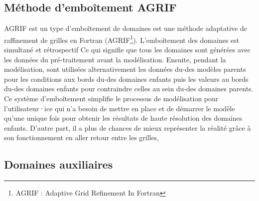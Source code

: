 \documentclass[10pt,a4paper,titlepage]{article}
\begin{document}
\subsection{Méthode d'emboîtement AGRIF}
\label{anx:AGRIF}
AGRIF est un type d'emboîtement de domaines est une méthode adaptative de raffinement de grilles en Fortran (AGRIF\footnote{AGRIF : Adaptive Grid Refinement In Fortran}).
L'emboîtement des domaines est simultané et rétrospectif
Ce qui signifie que tous les domaines sont générées avec les données du pré-traitement avant la modélisation.
Ensuite, pendant la modélisation, sont utilisées alternativement les données du-des modèles parents pour les conditions aux bords du-des domaines enfants puis les valeurs au bords du-des domaines enfants pour contraindre celles au sein du-des domaines parents.
Ce système d'emboîtement simplifie le processus de modélisation pour l'utilisateur·ice qui n'a besoin de mettre en place et de démarrer le modèle qu'une unique fois pour obtenir les résultats de haute résolution des domaines enfants.
D'autre part, il a plus de chances de mieux représenter la réalité grâce à son fonctionnement en aller retour entre les grilles,

\subsection{Domaines auxiliaires}
\end{document}
